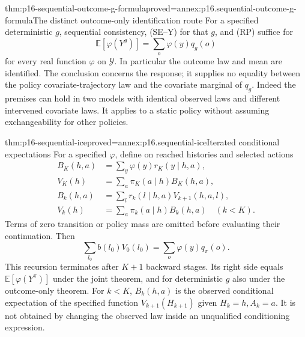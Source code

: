 \begin{hbtheorem}{thm:p16-sequential-outcome-g-formula}{proved=annex:p16.sequential-outcome-g-formula}{The distinct outcome-only identification route}
For a specified deterministic \(g\), sequential consistency, (SE--Y)
for that \(g\), and (RP) suffice for
\[
 \mathbb E[\varphi(Y^g)]=\sum_o\varphi(y)q_g(o)
\]
for every real function \(\varphi\) on \(\mathcal Y\). In particular the
outcome law and mean are identified. The conclusion concerns the response;
it supplies no equality between the policy covariate-trajectory law and
the covariate marginal of \(q_g\). Indeed the premises can hold in two
models with identical observed laws and different intervened covariate
laws. It applies to a static policy without assuming exchangeability for
other policies.
\end{hbtheorem}

\begin{hbtheorem}{thm:p16-sequential-ice}{proved=annex:p16.sequential-ice}{Iterated conditional expectations}
For a specified \(\varphi\), define on reached histories and selected actions
\[
\begin{aligned}
 B_K(h,a)&=\sum_y\varphi(y)r_K(y\mid h,a),\\
 V_K(h)&=\sum_a\pi_K(a\mid h)B_K(h,a),\\
 B_k(h,a)&=\sum_l r_k(l\mid h,a)V_{k+1}(h,a,l),\\
 V_k(h)&=\sum_a\pi_k(a\mid h)B_k(h,a)\quad(k<K).
\end{aligned}
\]
Terms of zero transition or policy mass are omitted before evaluating their
continuation. Then
\[
 \sum_{l_0}b(l_0)V_0(l_0)=\sum_o\varphi(y)q_\pi(o).
\]
This recursion terminates after \(K+1\) backward stages. Its right side
equals \(\mathbb E[\varphi(Y^\pi)]\) under the joint theorem, and for
deterministic \(g\) also under the outcome-only theorem. For \(k<K\),
\(B_k(h,a)\) is the observed conditional expectation of the specified
function \(V_{k+1}(H_{k+1})\) given \(H_k=h,A_k=a\). It is not obtained
by changing the observed law inside an unqualified conditioning expression.
\end{hbtheorem}

